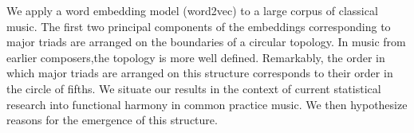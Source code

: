 We apply a word embedding model (word2vec) to a large corpus of classical music.
The first two principal components of the embeddings corresponding to major triads are arranged on the boundaries of a circular topology. In music from earlier composers,the topology is more well defined. Remarkably, the order in which major triads are arranged on this structure corresponds to their order in the circle of fifths. We situate our results in the context of current statistical research into functional harmony in common practice music. We then hypothesize reasons for the emergence of this structure.
